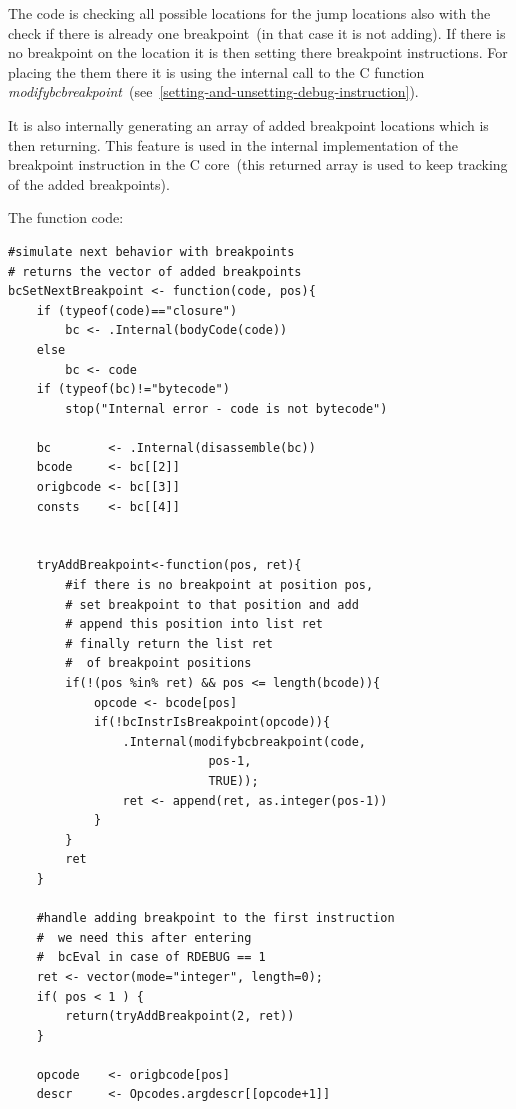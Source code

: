 \documentclass[thesis=M,english]{FITthesis}[2018/10/20]
\begin{document}
The code is checking all possible locations for the jump locations also with the check if there is already one breakpoint~(in that case it is not adding). If there is no breakpoint on the location it is then setting there breakpoint instructions. For placing the them there it is using the internal call to the C function \textit{modifybcbreakpoint}~(see~\ref{setting-and-unsetting-debug-instruction}).

It is also internally generating an array of added breakpoint locations which is then returning. This feature is used in the internal implementation of the breakpoint instruction in the C core~(this returned array is used to keep tracking of the added breakpoints).

The function code:

\begin{lstlisting}
#simulate next behavior with breakpoints
# returns the vector of added breakpoints
bcSetNextBreakpoint <- function(code, pos){
    if (typeof(code)=="closure")
        bc <- .Internal(bodyCode(code))
    else
        bc <- code
    if (typeof(bc)!="bytecode")
        stop("Internal error - code is not bytecode")

    bc        <- .Internal(disassemble(bc))
    bcode     <- bc[[2]]
    origbcode <- bc[[3]]
    consts    <- bc[[4]]


    tryAddBreakpoint<-function(pos, ret){
        #if there is no breakpoint at position pos, 
        # set breakpoint to that position and add 
        # append this position into list ret
        # finally return the list ret 
        #  of breakpoint positions
        if(!(pos %in% ret) && pos <= length(bcode)){
            opcode <- bcode[pos]
            if(!bcInstrIsBreakpoint(opcode)){
                .Internal(modifybcbreakpoint(code, 
                			pos-1, 
                			TRUE));
                ret <- append(ret, as.integer(pos-1))
            }
        }
        ret
    }

    #handle adding breakpoint to the first instruction
    #  we need this after entering 
    #  bcEval in case of RDEBUG == 1
    ret <- vector(mode="integer", length=0);
    if( pos < 1 ) {
        return(tryAddBreakpoint(2, ret))
    }

    opcode    <- origbcode[pos]
    descr     <- Opcodes.argdescr[[opcode+1]]


\end{lstlisting}
\end{document}
